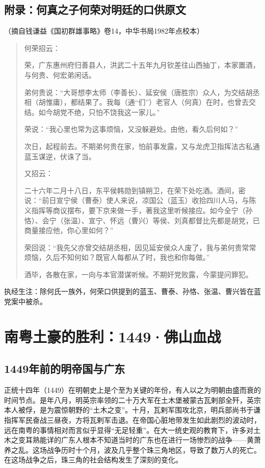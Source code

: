 \section*{附录：何真之子何荣对明廷的口供原文}

（摘自钱谦益《国初群雄事略》卷14，中华书局1982年点校本）

\begin{quote}
何荣招云：

荣，广东惠州府归善县人，洪武二十五年九月钦差往山西抽丁，本家置酒，与何贵、何宏弟闲话。

弟何贵说：“大哥想李太师（李善长）、延安侯（唐胜宗）众人，为交结胡丞相（胡惟庸），都结果了。我每（通“们”）老官人（何真）在时，也曾去交结。如今胡党不绝，只怕不饶我这一家儿。”

荣说：“我心里也常为这事烦恼，又没躲避处。由他，看久后何如？”

次日，起程前去。不期弟何贵在家，怕前事发露，又与龙虎卫指挥法古私通蓝玉谋逆，伏诛了当。

又招云：

二十六年二月十八日，东平侯韩勋到镇朔卫，在荣下处吃酒。酒间，密说：“前日宣宁侯（曹泰）使人来说，凉国公（蓝玉）收拾四川人马，与陈义指挥等商议摆布，要下京来做一手，著我这里听候接应。如今全宁（孙恪）、会宁（张温）、宣宁、怀远（曹兴）等侯、刘真都督比先都是胡党，已商量接应他，你心里如何？”

荣回说：“我先父亦曾交结胡丞相，因见延安侯众人废了，我与弟何贵常常烦恼，久后不知何如？既官人每都从了时，我也和你每做。”

酒毕，各散在家，一向与本官潜谋听候。不期奸党败露，今蒙提问罪犯。

\end{quote}

执经生注：除何氏一族外，何荣口供提到的蓝玉、曹泰、孙恪、张温、曹兴皆在蓝党案中被杀。

\chapter{南粤土豪的胜利：1449·佛山血战}

\section*{1449年前的明帝国与广东}

正统十四年（1449）在明朝史上是个至为关键的年份，有人以之为明朝由盛而衰的时间节点。是年八月，明英宗率领的二十万大军在土木堡被蒙古瓦剌部全歼，英宗本人被俘，是为震惊朝野的“土木之变”。十月，瓦剌军围攻北京，明兵部尚书于谦指挥军民奋战三昼夜，方将瓦剌军击退。在帝国心脏地带发生如此剧烈的波动时，远在南粤的事情相对而言似乎显得“无足轻重”。在大一统史观的教育下，许多对土木之变耳熟能详的广东人根本不知道当时的广东也在进行一场惨烈的战争——黄萧养之乱。这场战争历时十个月，波及几乎整个珠三角地区，导致了数万人的死亡。在这场战争之后，珠三角的社会结构发生了深刻的变化。


